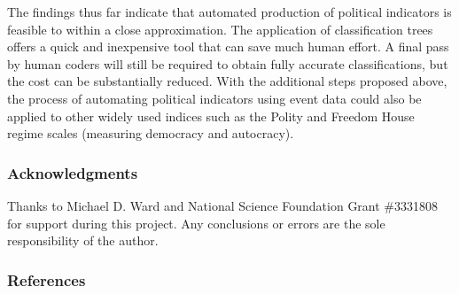 \documentclass[12pt,letterpaper]{article} %
\begin{document}
The findings thus far indicate that automated production of political indicators is feasible to within a close approximation. The application of classification trees offers a quick and inexpensive tool that can save much human effort. A final pass by human coders will still be required to obtain fully accurate classifications, but the cost can be substantially reduced. With the additional steps proposed above, the process of automating political indicators using event data could also be applied to other widely used indices such as the Polity and Freedom House regime scales (measuring democracy and autocracy).

\subsubsection*{Acknowledgments}

Thanks to Michael D. Ward and National Science Foundation Grant \#3331808 for support during this project. Any conclusions or errors are the sole responsibility of the author.

\newpage
\subsubsection*{References}



\begingroup
\renewcommand{\section}[2]{}


\endgroup
\end{document}
